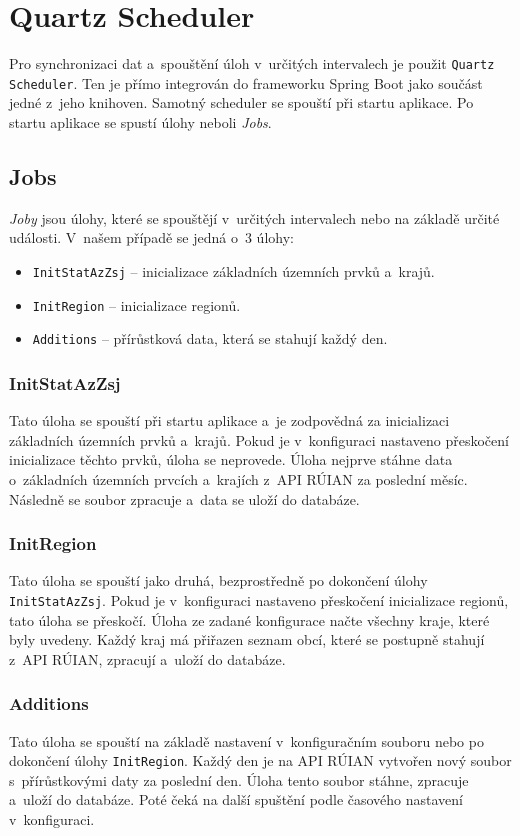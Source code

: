 \newpage

\section{Quartz Scheduler}
Pro synchronizaci dat a~spouštění úloh v~určitých intervalech je použit \texttt{Quartz Scheduler}.
Ten je přímo integrován do frameworku Spring Boot jako součást jedné z~jeho knihoven.
Samotný scheduler se spouští při startu aplikace.
Po startu aplikace se spustí úlohy neboli \textit{Jobs}.

\subsection{Jobs}
\textit{Joby} jsou úlohy, které se spouštějí v~určitých intervalech nebo na základě určité události.
V~našem případě se jedná o~3 úlohy:
\begin{itemize}
    \item \texttt{InitStatAzZsj} -- inicializace základních územních prvků a~krajů.
    \item \texttt{InitRegion} -- inicializace regionů.
    \item \texttt{Additions} -- přírůstková data, která se stahují každý den.
\end{itemize}

\subsubsection*{InitStatAzZsj}
Tato úloha se spouští při startu aplikace a~je zodpovědná za inicializaci základních územních prvků a~krajů.
Pokud je v~konfiguraci nastaveno přeskočení inicializace těchto prvků, úloha se neprovede.
Úloha nejprve stáhne data o~základních územních prvcích a~krajích z~API RÚIAN za poslední měsíc.
Následně se soubor zpracuje a~data se uloží do databáze.

\subsubsection*{InitRegion}
Tato úloha se spouští jako druhá, bezprostředně po dokončení úlohy \texttt{InitStatAzZsj}.
Pokud je v~konfiguraci nastaveno přeskočení inicializace regionů, tato úloha se přeskočí.
Úloha ze zadané konfigurace načte všechny kraje, které byly uvedeny.
Každý kraj má přiřazen seznam obcí, které se postupně stahují z~API RÚIAN, zpracují a~uloží do databáze.

\subsubsection*{Additions}
Tato úloha se spouští na základě nastavení v~konfiguračním souboru nebo po dokončení úlohy \texttt{InitRegion}.
Každý den je na API RÚIAN vytvořen nový soubor s~přírůstkovými daty za poslední den.
Úloha tento soubor stáhne, zpracuje a~uloží do databáze.
Poté čeká na další spuštění podle časového nastavení v~konfiguraci.


